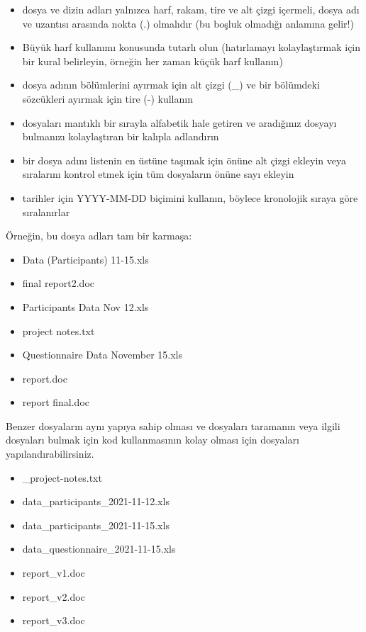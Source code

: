 \documentclass[
  oneside]{book}
\providecommand{\tightlist}{%
  \setlength{\itemsep}{0pt}\setlength{\parskip}{0pt}}
\begin{document}
\begin{itemize}
\tightlist
\item
  dosya ve dizin adları yalnızca harf, rakam, tire ve alt çizgi içermeli, dosya adı ve uzantısı arasında nokta (.) olmalıdır (bu boşluk olmadığı anlamına gelir!)
\item
  Büyük harf kullanımı konusunda tutarlı olun (hatırlamayı kolaylaştırmak için bir kural belirleyin, örneğin her zaman küçük harf kullanın)
\item
  dosya adının bölümlerini ayırmak için alt çizgi (\_) ve bir bölümdeki sözcükleri ayırmak için tire (-) kullanın
\item
  dosyaları mantıklı bir sırayla alfabetik hale getiren ve aradığınız dosyayı bulmanızı kolaylaştıran bir kalıpla adlandırın
\item
  bir dosya adını listenin en üstüne taşımak için önüne alt çizgi ekleyin veya sıralarını kontrol etmek için tüm dosyaların önüne sayı ekleyin
\item
  tarihler için YYYY-MM-DD biçimini kullanın, böylece kronolojik sıraya göre sıralanırlar
\end{itemize}

Örneğin, bu dosya adları tam bir karmaşa:

\begin{itemize}
\tightlist
\item
  Data (Participants) 11-15.xls
\item
  final report2.doc
\item
  Participants Data Nov 12.xls
\item
  project notes.txt
\item
  Questionnaire Data November 15.xls
\item
  report.doc
\item
  report final.doc
\end{itemize}

Benzer dosyaların aynı yapıya sahip olması ve dosyaları taramanın veya ilgili dosyaları bulmak için kod kullanmasının kolay olması için dosyaları yapılandırabilirsiniz.

\begin{itemize}
\tightlist
\item
  \_project-notes.txt
\item
  data\_participants\_2021-11-12.xls
\item
  data\_participants\_2021-11-15.xls
\item
  data\_questionnaire\_2021-11-15.xls
\item
  report\_v1.doc
\item
  report\_v2.doc
\item
  report\_v3.doc
\end{itemize}
\end{document}
